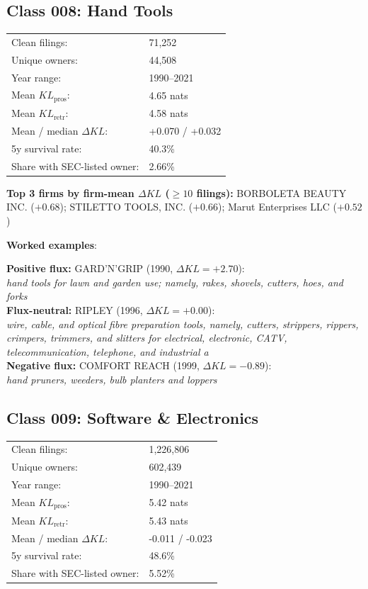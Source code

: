 \subsection*{Class 008: Hand Tools}
\label{app:industry-008}

\begin{tabular}{ll}
Clean filings: & 71,252 \\
Unique owners: & 44,508 \\
Year range: & 1990--2021 \\
Mean $KL_\text{pros}$: & 4.65 nats \\
Mean $KL_\text{retr}$: & 4.58 nats \\
Mean / median $\Delta KL$: & +0.070 / +0.032 \\
5y survival rate: & 40.3\% \\
Share with SEC-listed owner: & 2.66\% \\
\end{tabular}

\textbf{Top 3 firms by firm-mean $\Delta KL$ ($\geq 10$ filings):} BORBOLETA BEAUTY INC. ($+0.68$); STILETTO TOOLS, INC. ($+0.66$); Marut Enterprises LLC ($+0.52$)

\textbf{Worked examples}:

  \textbf{Positive flux:} \textsc{GARD'N'GRIP} (1990, $\Delta KL=+2.70$):\\
  \textit{hand tools for lawn and garden use; namely, rakes, shovels, cutters, hoes, and forks}\\
  \textbf{Flux-neutral:} \textsc{RIPLEY} (1996, $\Delta KL=+0.00$):\\
  \textit{wire, cable, and optical fibre preparation tools, namely, cutters, strippers, rippers, crimpers, trimmers, and slitters for electrical, electronic, CATV, telecommunication, telephone, and industrial a}\\
  \textbf{Negative flux:} \textsc{COMFORT REACH} (1999, $\Delta KL=-0.89$):\\
  \textit{hand pruners, weeders, bulb planters and loppers}\\

\subsection*{Class 009: Software \& Electronics}
\label{app:industry-009}

\begin{tabular}{ll}
Clean filings: & 1,226,806 \\
Unique owners: & 602,439 \\
Year range: & 1990--2021 \\
Mean $KL_\text{pros}$: & 5.42 nats \\
Mean $KL_\text{retr}$: & 5.43 nats \\
Mean / median $\Delta KL$: & -0.011 / -0.023 \\
5y survival rate: & 48.6\% \\
Share with SEC-listed owner: & 5.52\% \\
\end{tabular}

